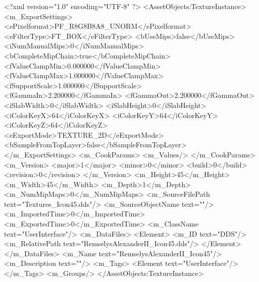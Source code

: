 <?xml version="1.0" encoding="UTF-8" ?>
<AssetObjects:TextureInstance>
	<m_ExportSettings>
		<ePixelformat>PF_R8G8B8A8_UNORM</ePixelformat>
		<eFilterType>FT_BOX</eFilterType>
		<bUseMips>false</bUseMips>
		<iNumManualMips>0</iNumManualMips>
		<bCompleteMipChain>true</bCompleteMipChain>
		<fValueClampMin>0.000000</fValueClampMin>
		<fValueClampMax>1.000000</fValueClampMax>
		<fSupportScale>1.000000</fSupportScale>
		<fGammaIn>2.200000</fGammaIn>
		<fGammaOut>2.200000</fGammaOut>
		<iSlabWidth>0</iSlabWidth>
		<iSlabHeight>0</iSlabHeight>
		<iColorKeyX>64</iColorKeyX>
		<iColorKeyY>64</iColorKeyY>
		<iColorKeyZ>64</iColorKeyZ>
		<eExportMode>TEXTURE_2D</eExportMode>
		<bSampleFromTopLayer>false</bSampleFromTopLayer>
	</m_ExportSettings>
	<m_CookParams>
		<m_Values/>
	</m_CookParams>
	<m_Version>
		<major>1</major>
		<minor>0</minor>
		<build>0</build>
		<revision>0</revision>
	</m_Version>
	<m_Height>45</m_Height>
	<m_Width>45</m_Width>
	<m_Depth>1</m_Depth>
	<m_NumMipMaps>0</m_NumMipMaps>
	<m_SourceFilePath text="Textures\RemselysAlexanderII_Icon45.dds"/>
	<m_SourceObjectName text=""/>
	<m_ImportedTime>0</m_ImportedTime>
	<m_ExportedTime>0</m_ExportedTime>
	<m_ClassName text="UserInterface"/>
	<m_DataFiles>
		<Element>
			<m_ID text="DDS"/>
			<m_RelativePath text="RemselysAlexanderII_Icon45.dds"/>
		</Element>
	</m_DataFiles>
	<m_Name text="RemselysAlexanderII_Icon45"/>
	<m_Description text=""/>
	<m_Tags>
		<Element text="UserInterface"/>
	</m_Tags>
	<m_Groups/>
</AssetObjects:TextureInstance>
